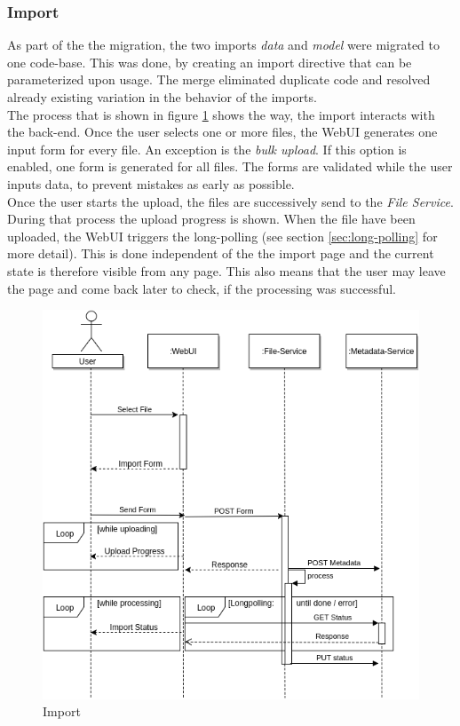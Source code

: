 \subsubsection{Import}
As part of the the migration, the two imports \textit{data} and \textit{model} were migrated to one code-base. This was done, by creating an import directive that can be parameterized upon usage. The merge eliminated duplicate code and resolved already existing variation in the behavior of the imports.\\
The process that is shown in figure \ref{fig:import} shows the way, the import interacts with the back-end. Once the user selects one or more files, the WebUI generates one input form for every file. An exception is the \textit{bulk upload}. If this option is enabled, one form is generated for all files. The forms are validated while the user inputs data, to prevent mistakes as early as possible.\\
Once the user starts the upload, the files are successively send to the \textit{File Service}. During that process the upload progress is shown. When the file have been uploaded, the WebUI triggers the long-polling (see section \ref{sec:long-polling} for more detail). This is done independent of the the import page and the current state is therefore visible from any page. This also means that the user may leave the page and come back later to check, if the processing was successful.
\begin{figure}[H]
	\centering\includegraphics[width=.75\textwidth]{res/Import}
	\caption{Import}
	\label{fig:import}
\end{figure}


